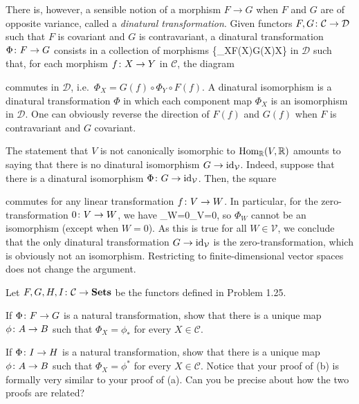 There is, however, a sensible notion of a morphism $F\to G$ when $F$ and $G$ are of opposite variance, called a \emph{dinatural transformation}. Given functors $F,G\colon \mathcal{C}\to\mathcal{D}$ such that $F$ is covariant and $G$ is contravariant, a dinatural transformation $\Phi\colon F\to G$ consists in a collection of morphisms
\bse
\{\Phi_X\cl F(X)\to G(X)\mid X\in {}\}
\ese
in $\mathcal{D}$ such that, for each morphism $f\colon X\to Y$ in $\mathcal{C}$, the diagram
\bse
{}
\ese
commutes in $\mathcal{D}$, i.e.\ $\Phi_X=G(f)\circ\Phi_Y\circ F(f)$. A dinatural isomorphism is a dinatural transformation $\Phi$ in which each component map $\Phi_X$ is an isomorphism in $\mathcal{D}$. One can obviously reverse the direction of $F(f)$ and $G(f)$ when $F$ is contravariant and $G$ covariant.

The statement that $V$ is not canonically isomorphic to $\operatorname{Hom}_{\mathbb{R}}(V,\mathbb{R})$ amounts to saying that there is no dinatural isomorphism $G\to \mathrm{id}_{\mathcal{V}}$. Indeed, suppose that there is a dinatural isomorphism $\Phi\colon G\to \mathrm{id}_{\mathcal{V}}$. Then, the square
\bse
{}
\ese
commutes for any linear transformation $f\colon V\to W$. In particular, for the zero-transformation $0\colon V\to W$, we have
\bse
\Phi_W=0\circ\Phi_V=0,
\ese
so $\Phi_W$ cannot be an isomorphism (except when $W=0$). As this is true for all $W\in\mathcal{V}$, we conclude that the only dinatural transformation $G\to \mathrm{id}_{\mathcal{V}}$ is the zero-transformation, which is obviously not an isomorphism. Restricting to finite-dimensional vector spaces does not change the argument.
\een
\es

\addtocounter{exercise}{1}

\bp
Let $F,G, H, I \colon \mathcal{C} \to \mathbf{Sets}$ be the functors defined in Problem 1.25.
\ben[label=(\alph*)]
\item If $\Phi\colon F\to G$ is a natural transformation, show that there is a unique map $\phi \colon A \to B$ such that $\Phi_X = \phi_*$ for every $X \in \mathcal{C}$.
\item If $\Phi \colon I \to H$ is a natural transformation, show that there is a unique map $\phi\colon A \to B$ such that $\Phi_X = \phi^*$ for every $X \in \mathcal{C}$.
\een
Notice that your proof of (b) is formally very similar to your proof of (a). Can you be precise about how the two proofs are related?

